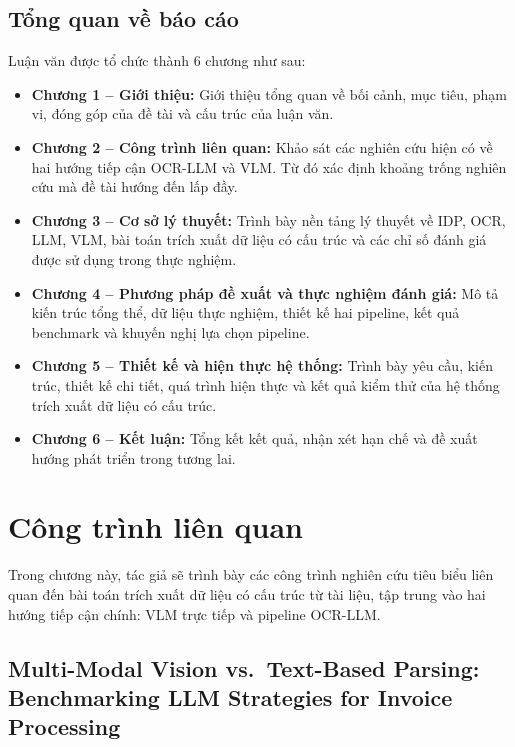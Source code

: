﻿\documentclass[12pt]{report}
\begin{document}
\section{Tổng quan về báo cáo}\label{sec:tongquan}

Luận văn được tổ chức thành 6 chương như sau:

\begin{itemize}
    \item \textbf{Chương 1 -- Giới thiệu:} Giới thiệu tổng quan về bối cảnh, mục tiêu, phạm vi, đóng góp của đề tài và cấu trúc của luận văn.
    \item \textbf{Chương 2 -- Công trình liên quan:} Khảo sát các nghiên cứu hiện có về hai hướng tiếp cận OCR-LLM và VLM. Từ đó xác định khoảng trống nghiên cứu mà đề tài hướng đến lấp đầy.
    \item \textbf{Chương 3 -- Cơ sở lý thuyết:} Trình bày nền tảng lý thuyết về IDP, OCR, LLM, VLM, bài toán trích xuất dữ liệu có cấu trúc và các chỉ số đánh giá được sử dụng trong thực nghiệm.
    \item \textbf{Chương 4 -- Phương pháp đề xuất và thực nghiệm đánh giá:} Mô tả kiến trúc tổng thể, dữ liệu thực nghiệm, thiết kế hai pipeline, kết quả benchmark và khuyến nghị lựa chọn pipeline.
    \item \textbf{Chương 5 -- Thiết kế và hiện thực hệ thống:} Trình bày yêu cầu, kiến trúc, thiết kế chi tiết, quá trình hiện thực và kết quả kiểm thử của hệ thống trích xuất dữ liệu có cấu trúc.
    \item \textbf{Chương 6 -- Kết luận:} Tổng kết kết quả, nhận xét hạn chế và đề xuất hướng phát triển trong tương lai.
\end{itemize}

\clearpage

\chapter{Công trình liên quan}

Trong chương này, tác giả sẽ trình bày các công trình nghiên cứu tiêu biểu liên quan đến bài toán trích xuất dữ liệu có cấu trúc từ tài liệu, tập trung vào hai hướng tiếp cận chính: VLM trực tiếp và pipeline OCR-LLM.

\section[Multi-Modal Vision vs.\ Text-Based Parsing]{Multi-Modal Vision vs.\ Text-Based Parsing: Benchmarking LLM Strategies for Invoice Processing}\label{sec:rw_berghaus}
\end{document}
